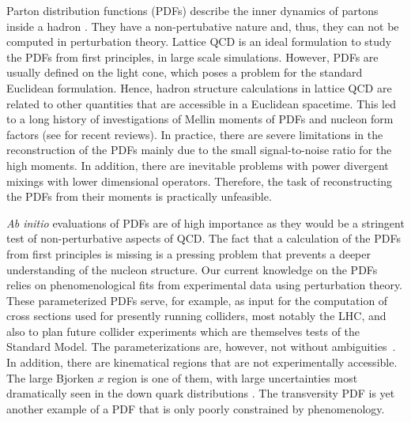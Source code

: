 \documentclass[12pt,tighten,nofootinbib,amssymb,floatfix]{article}
\begin{document}
Parton distribution functions (PDFs) describe the inner dynamics of partons inside a hadron \cite{Feynman:102074}.
They have a non-pertubative nature and, thus, they can not be computed in perturbation theory. Lattice QCD is an
ideal formulation to study the PDFs from first principles, in large scale simulations. 
However, PDFs are usually defined on the light cone, which poses a problem for the standard Euclidean formulation.
Hence,  hadron structure calculations in lattice QCD are related to other quantities  that are accessible in a Euclidean 
spacetime. This led to a long history of investigations of Mellin moments of PDFs and nucleon form factors (see
\cite{Constantinou:2014tga, Constantinou:2015agp,Alexandrou:2015yqa, Alexandrou:2015xts, Syritsyn:2014saa}
for recent reviews). In practice, there are severe limitations in the reconstruction of the PDFs mainly due to the small signal-to-noise ratio for the 
high moments. In addition,  there are inevitable problems with power divergent mixings with lower dimensional operators.
Therefore, the task of reconstructing the PDFs from their moments is practically unfeasible.

\medskip
{\textit{Ab initio}} evaluations of PDFs are of high importance as they would be a stringent test of non-perturbative 
aspects of QCD. The fact that a calculation of the PDFs from first principles is missing is a pressing problem that 
prevents a deeper understanding of the nucleon structure. 
Our current knowledge on the PDFs relies on phenomenological fits from experimental data using perturbation theory.
These parameterized PDFs serve, for example, as input for the computation of cross sections used for
presently running colliders, most notably the LHC, and also to plan future collider experiments which are themselves 
tests of the Standard Model. The parameterizations are, however, not without ambiguities~\cite{Jimenez-Delgado:2013sma}.
In addition, there are kinematical regions that are not experimentally accessible.
The large Bjorken $x$ region is one of them, with large uncertainties most dramatically seen in the down quark 
distributions \cite{Accardi:2016qay,Alekhin:2017kpj}. The transversity PDF is yet another example of a PDF that is 
only poorly constrained by phenomenology.
\end{document}
